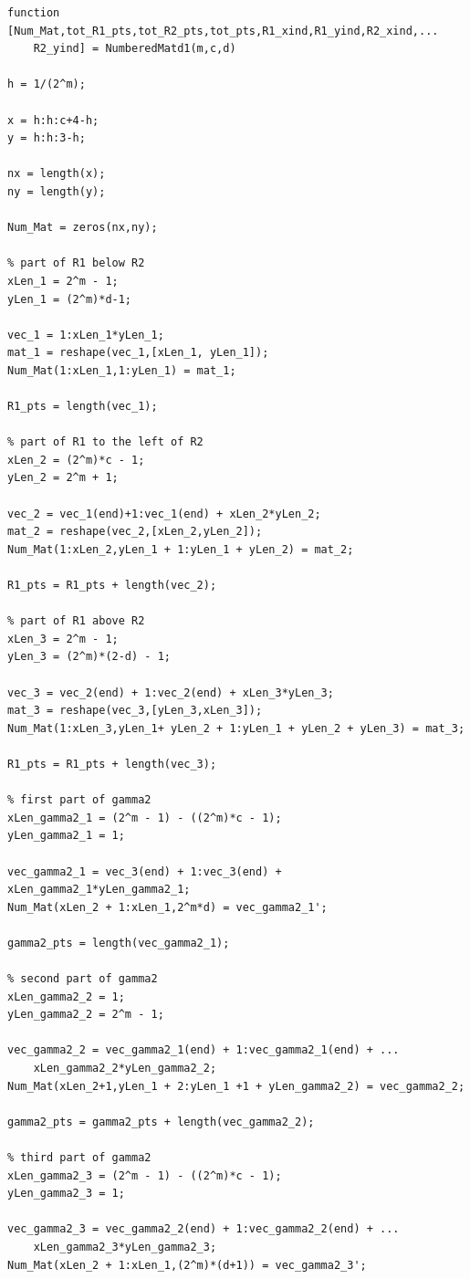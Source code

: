 \documentclass[12pt]{article}
\begin{document}
\lstset{language=matlab,frame=single}
\begin{lstlisting}[caption=Enumeration for b between 0 and 2]
function [Num_Mat,tot_R1_pts,tot_R2_pts,tot_pts,R1_xind,R1_yind,R2_xind,...
    R2_yind] = NumberedMatd1(m,c,d)

h = 1/(2^m);

x = h:h:c+4-h;
y = h:h:3-h;

nx = length(x);
ny = length(y);

Num_Mat = zeros(nx,ny);

% part of R1 below R2
xLen_1 = 2^m - 1;
yLen_1 = (2^m)*d-1;

vec_1 = 1:xLen_1*yLen_1;
mat_1 = reshape(vec_1,[xLen_1, yLen_1]);
Num_Mat(1:xLen_1,1:yLen_1) = mat_1;

R1_pts = length(vec_1);

% part of R1 to the left of R2
xLen_2 = (2^m)*c - 1;
yLen_2 = 2^m + 1;

vec_2 = vec_1(end)+1:vec_1(end) + xLen_2*yLen_2;
mat_2 = reshape(vec_2,[xLen_2,yLen_2]);
Num_Mat(1:xLen_2,yLen_1 + 1:yLen_1 + yLen_2) = mat_2;

R1_pts = R1_pts + length(vec_2);

% part of R1 above R2
xLen_3 = 2^m - 1;
yLen_3 = (2^m)*(2-d) - 1;

vec_3 = vec_2(end) + 1:vec_2(end) + xLen_3*yLen_3;
mat_3 = reshape(vec_3,[yLen_3,xLen_3]);
Num_Mat(1:xLen_3,yLen_1+ yLen_2 + 1:yLen_1 + yLen_2 + yLen_3) = mat_3;

R1_pts = R1_pts + length(vec_3);

% first part of gamma2
xLen_gamma2_1 = (2^m - 1) - ((2^m)*c - 1);
yLen_gamma2_1 = 1;

vec_gamma2_1 = vec_3(end) + 1:vec_3(end) + xLen_gamma2_1*yLen_gamma2_1;
Num_Mat(xLen_2 + 1:xLen_1,2^m*d) = vec_gamma2_1';

gamma2_pts = length(vec_gamma2_1);

% second part of gamma2
xLen_gamma2_2 = 1;
yLen_gamma2_2 = 2^m - 1;

vec_gamma2_2 = vec_gamma2_1(end) + 1:vec_gamma2_1(end) + ...
    xLen_gamma2_2*yLen_gamma2_2;
Num_Mat(xLen_2+1,yLen_1 + 2:yLen_1 +1 + yLen_gamma2_2) = vec_gamma2_2;

gamma2_pts = gamma2_pts + length(vec_gamma2_2);

% third part of gamma2
xLen_gamma2_3 = (2^m - 1) - ((2^m)*c - 1);
yLen_gamma2_3 = 1;

vec_gamma2_3 = vec_gamma2_2(end) + 1:vec_gamma2_2(end) + ...
    xLen_gamma2_3*yLen_gamma2_3;
Num_Mat(xLen_2 + 1:xLen_1,(2^m)*(d+1)) = vec_gamma2_3';


\end{lstlisting}
\end{document}
